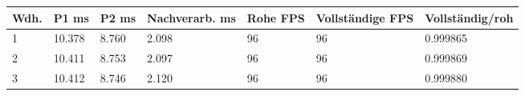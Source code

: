 \begin{tabular}{lllllll}
\hline
Wdh. & P1 ms & P2 ms & Nachverarb. ms & Rohe FPS & Vollständige FPS & Vollständig/roh \\
\hline
1 & 10.378 & 8.760 & 2.098 & 96 & 96 & 0.999865 \\
2 & 10.411 & 8.753 & 2.097 & 96 & 96 & 0.999869 \\
3 & 10.412 & 8.746 & 2.120 & 96 & 96 & 0.999880 \\
\hline
\end{tabular}
